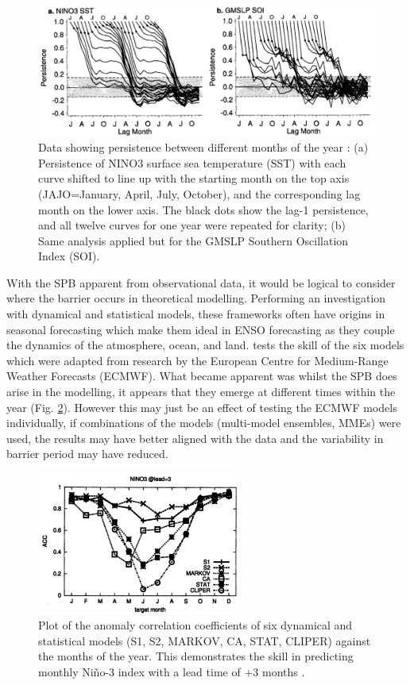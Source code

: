 \documentclass[12pt, onecolumn]{revtex4}    %
\begin{document}
\begin{figure}
\includegraphics[width=\textwidth]{data/persistence_sst_soi}
\caption[Persistence]{Data showing persistence between different months of the year \citep{torrence1998annual}: (a) Persistence of NINO3 surface sea temperature (SST) with each curve shifted to line up with the starting month on the top axis (JAJO=January, April, July, October), and the corresponding lag month on the lower axis. The black dots show the lag-1 persistence, and all twelve curves for one year were repeated for clarity; (b) Same analysis applied but for the GMSLP Southern Oscillation Index (SOI). }
\label{fig:persistence_sst_soi}
\end{figure}

With the SPB apparent from observational data, it would be logical to consider where the barrier occurs in theoretical modelling. Performing an investigation with dynamical and statistical models, these frameworks often have origins in seasonal forecasting which make them ideal in ENSO forecasting as they couple the dynamics of the atmosphere, ocean, and land. \cite{jan2005did} tests the skill of the six models which were adapted from research by the European Centre for Medium-Range Weather Forecasts (ECMWF). What became apparent was whilst the SPB does arise in the modelling, it appears that they emerge at different times within the year (Fig. \ref{fig:ecmwf_plot}). However this may just be an effect of testing the ECMWF models individually, if combinations of the models (multi-model ensembles, MMEs) were used, the results may have better aligned with the data and the variability in barrier period may have reduced. \\

\begin{figure}
\includegraphics[width=0.6\textwidth]{data/ecmwf_data}
\caption[Persistence]{Plot of the anomaly correlation coefficients of six dynamical and statistical models (S1, S2, MARKOV, CA, STAT, CLIPER) against the months of the year. This demonstrates the skill in predicting monthly Ni\~{n}o-3 index with a lead time of $+3$ months \citep{jan2005did}.}
\label{fig:ecmwf_plot}
\end{figure}
\end{document}
